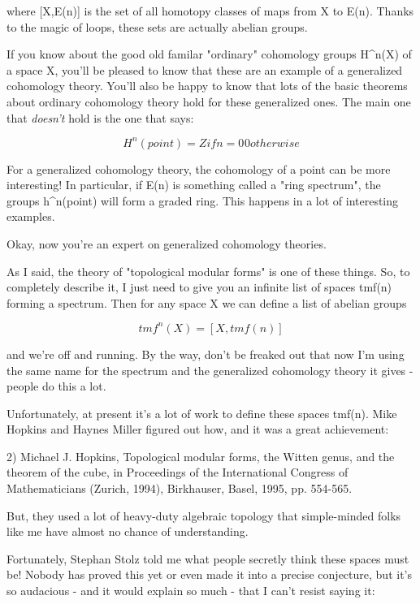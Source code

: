 where [X,E(n)] is the set of all homotopy classes of maps from
X to E(n).  Thanks to the magic of loops, these sets are actually
abelian groups.  

If you know about the good old familar "ordinary" cohomology groups 
H^{n}(X) of a space X, you'll be pleased to know that these are an 
example of a generalized cohomology theory.  You'll also be happy 
to know that lots of the basic theorems about ordinary cohomology 
theory hold for these generalized ones.  The main one that \emph{doesn't}
hold is the one that says: 


$$

H^{n}(point) = Z  if n = 0
^{ }           0  otherwise
$$
    
For a generalized cohomology theory, the cohomology of a point
can be more interesting!  In particular, if E(n) is something called
a "ring spectrum", the groups h^{n}(point) will form a 
graded ring.
This happens in a lot of interesting examples.

Okay, now you're an expert on generalized cohomology theories.

As I said, the theory of "topological modular forms" is one of
these things.  So, to completely describe it, I just need to
give you an infinite list of spaces tmf(n) forming a spectrum.  
Then for any space X we can define a list of abelian groups 


$$

tmf^{n}(X) = [X,tmf(n)]
$$
    
and we're off and running.  By the way, don't be freaked out that 
now I'm using the same name for the spectrum and the generalized 
cohomology theory it gives - people do this a lot.

Unfortunately, at present it's a lot of work to define these 
spaces tmf(n).  Mike Hopkins and Haynes Miller figured out how,
and it was a great achievement:

2) Michael J. Hopkins, Topological modular forms, the Witten
genus, and the theorem of the cube, in Proceedings of the 
International Congress of Mathematicians (Zurich, 1994), 
Birkhauser, Basel, 1995, pp. 554-565.

But, they used a lot of heavy-duty algebraic topology that 
simple-minded folks like me have almost no chance of understanding.  

Fortunately, Stephan Stolz told me what people secretly think
these spaces must be!  Nobody has proved this yet or even
made it into a precise conjecture, but it's so audacious - 
and it would explain so much - that I can't resist saying it:

